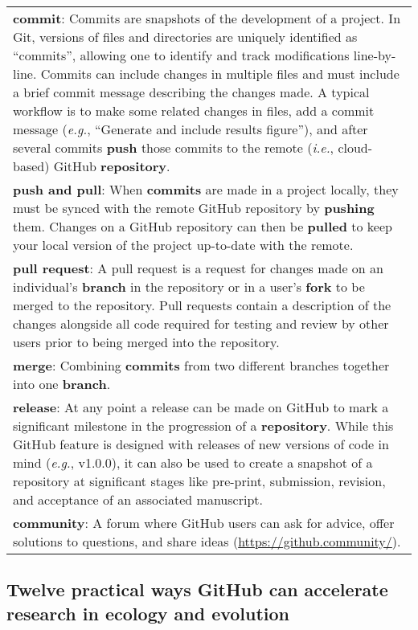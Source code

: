 \begin{tablenos:no-prefix-table-caption}
\begin{longtable}[]{@{}
  >{\raggedright\arraybackslash}p{}@{}}
\textbf{commit}: Commits are snapshots of the development of a project. In Git, versions of files and directories are uniquely identified as ``commits'', allowing one to identify and track modifications line-by-line. Commits can include changes in multiple files and must include a brief commit message describing the changes made. A typical workflow is to make some related changes in files, add a commit message (\emph{e.g.}, ``Generate and include results figure''), and after several commits \textbf{push} those commits to the remote (\emph{i.e.}, cloud-based) GitHub \textbf{repository}. \\
\textbf{push and pull}: When \textbf{commits} are made in a project locally, they must be synced with the remote GitHub repository by \textbf{pushing} them. Changes on a GitHub repository can then be \textbf{pulled} to keep your local version of the project up-to-date with the remote. \\
\textbf{pull request}: A pull request is a request for changes made on an individual's \textbf{branch} in the repository or in a user's \textbf{fork} to be merged to the repository. Pull requests contain a description of the changes alongside all code required for testing and review by other users prior to being merged into the repository. \\
\textbf{merge}: Combining \textbf{commits} from two different branches together into one \textbf{branch}. \\
\textbf{release}: At any point a release can be made on GitHub to mark a significant milestone in the progression of a \textbf{repository}. While this GitHub feature is designed with releases of new versions of code in mind (\emph{e.g.}, v1.0.0), it can also be used to create a snapshot of a repository at significant stages like pre-print, submission, revision, and acceptance of an associated manuscript. \\
\textbf{community}: A forum where GitHub users can ask for advice, offer solutions to questions, and share ideas (\url{https://github.community/}). \\
\bottomrule()
\end{longtable}

\end{tablenos:no-prefix-table-caption}

\hypertarget{twelve-practical-ways-github-can-accelerate-research-in-ecology-and-evolution}{%
\subsection{Twelve practical ways GitHub can accelerate research in ecology and evolution}\label{twelve-practical-ways-github-can-accelerate-research-in-ecology-and-evolution}}

